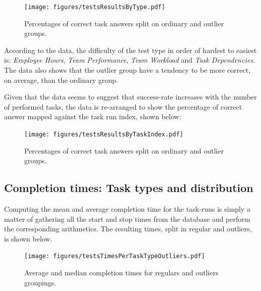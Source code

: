 \documentclass[nofilelist,dvipsnames]{cslthse-msc}
\begin{document}
				\begin{figure}[ht!]
					\centering
          \texttt{[image: figures/testsResultsByType.pdf]}
          \caption{
            Percentages of correct task answers split on ordinary and outlier
            groups.
          }
				\end{figure}

        According to the data, the difficulty of the test type in order of
        hardest to easiest is: \textit{Employee Hours}, \textit{Team
          Performance}, \textit{Team Workload} and \textit{Task Dependencies}.
        The data also shows that the outlier group have a tendency to be more
        correct, on average, than the ordinary group.

        Given that the data seems to suggest that success-rate increases with
        the number of performed tasks, the data is re-arranged to show the
        percentage of correct answer mapped against the task run index, shown
        below:

				\begin{figure}[ht!]
					\centering
          \texttt{[image: figures/testsResultsByTaskIndex.pdf]}
          \caption{
            Percentages of correct task answers split on ordinary and outlier
            groups.
          }
				\end{figure}

%

      \newpage
      \subsection{Completion times: Task types and distribution}

        Computing the mean and average completion time for the task-runs is
        simply a matter of gathering all the start and stop times from the
        database and perform the corresponding arithmetics. The resulting times,
        split in regular and outliers, is shown below.

        \begin{figure}[h!]
          \centering
          \texttt{[image: figures/testsTimesPerTaskTypeOutliers.pdf]}
          \caption{
            Average and median completion times for regulars and outliers
            groupings.
          }
          \label{label_testsTimesPerTaskTypeOutliers}
        \end{figure}
\end{document}
